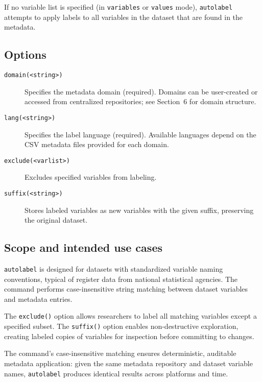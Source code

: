If no variable list is specified (in \texttt{variables} or \texttt{values} mode), \texttt{autolabel} attempts to apply labels to all variables in the dataset that are found in the metadata.

\subsection{Options}

\begin{description}
  \item[\texttt{domain(<string>)}]
    Specifies the metadata domain (required). Domains can be user-created or accessed from centralized repositories; see Section~6 for domain structure.

  \item[\texttt{lang(<string>)}]
    Specifies the label language (required). Available languages depend on the CSV metadata files provided for each domain.

  \item[\texttt{exclude(<varlist>)}]
    Excludes specified variables from labeling.

  \item[\texttt{suffix(<string>)}]
    Stores labeled variables as new variables with the given suffix, preserving the original dataset.

\end{description}

\subsection{Scope and intended use cases}

\texttt{autolabel} is designed for datasets with standardized variable naming conventions, typical of register data from national statistical agencies. The command performs case-insensitive string matching between dataset variables and metadata entries.

The \texttt{exclude()} option allows researchers to label all matching variables except a specified subset. The \texttt{suffix()} option enables non-destructive exploration, creating labeled copies of variables for inspection before committing to changes.

The command's case-insensitive matching ensures deterministic, auditable metadata application: given the same metadata repository and dataset variable names, \texttt{autolabel} produces identical results across platforms and time.


